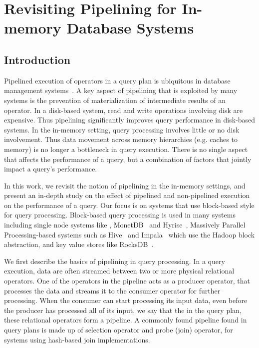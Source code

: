 \chapter{Revisiting Pipelining for In-memory Database Systems}\label{chap:pipeline}
\section{Introduction}

Pipelined execution of operators in a query plan is ubiquitous in database management systems~\cite{quickstep-system, monetdb, hyper, vectorwise, wang2016elastic}. 
A key aspect of pipelining that is exploited by many systems is the prevention of materialization of intermediate results of an operator.  
In a disk-based system, read and write operations involving disk are expensive.
Thus pipelining significantly improves query performance in disk-based systems. 
In the in-memory setting, query processing involves little or no disk involvement. 
Thus data movement across memory hierarchies (e.g. caches to memory) is no longer a bottleneck in query execution.
There is no single aspect that affects the performance of a query, but a combination of factors that jointly impact a query's performance. 

In this work, we revisit the notion of pipelining in the in-memory settings, and present an in-depth study on the effect of pipelined and non-pipelined execution on the performance of a query. 
Our focus is on systems that use block-based style for query processing.
Block-based query processing is used in many systems including single node systems like \sys{}, MonetDB~\cite{monetdb} and Hyrise~\cite{hyrise-website}, Massively Parallel Processing-based systems such as Hive~\cite{hive} and Impala~\cite{impala} which use the Hadoop block abstraction, and key value stores like RocksDB~\cite{rocksdb}.

We first describe the basics of pipelining in query processing. 
In a query execution, data are often streamed between two or more physical relational operators. 
One of the operators in the pipeline acts as a producer operator, that processes the data and streams it to the consumer operator for further processing. 
When the consumer can start processing its input data, even before the producer has processed all of its input, we say that the in the query plan, these relational operators form a pipeline.
A commonly found pipeline found in query plans is made up of selection operator and probe (join) operator, for systems using hash-based join implementations.

